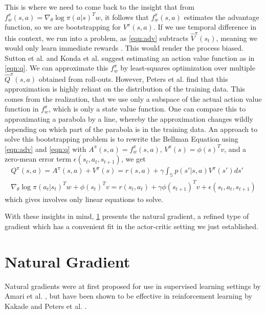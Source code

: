 This is where we need to come back to the insight that from $f_w^\pi(s,a) = {\nabla_\theta \log\pi(a|s)}^T w$, it follows that $f_w^\pi(s,a)$ estimates the advantage function, so we are bootstrapping for $V^\pi(s,a)$. 
If we use temporal difference in this context, we run into a problem, as \eqref{eqn:adv} subtracts $\hat{V}^\pi(s_t)$, meaning we would only learn immediate rewards \cite{Peters_IICHR_2003}. 
This would render the process biased. 
Sutton et al. \cite{Sutton:1999:PGM:3009657.3009806} and Konda et al. \cite{NIPS1999_1786} suggest estimating an action value function as in \eqref{eqn:q}. 
We can approximate this $f_w^\pi$ by least-squares optimization over multiple $\hat{Q}^\pi(s,a)$ obtained from roll-outs. 
However, Peters et al. \cite{4863} find that this approximation is highly reliant on the distribution of the training data. 
This comes from the realization, that we use only a subspace of the actual action value function in $f_w^\pi$, which is only a state value function. 
One can compare this to approximating a parabola by a line, whereby the approximation changes wildly depending on which part of the parabola is in the training data. 
An approach to solve this bootstrapping problem is to rewrite the Bellman Equation using \eqref{eqn:adv} and \eqref{eqn:q} with $A^\pi(s,a) = f_w^\pi(s,a)$, $V^\pi(s) = \phi(s)^T v$, and a zero-mean error term $\epsilon(s_t,a_t,s_{t+1})$, we get
\begin{align}
  Q^\pi(s,a) = A^\pi(s,a) + V^\pi(s) = r(s,a) + \gamma \int_\mathbb{S} p(s'|s,a)V^\pi(s')ds' \\
  \nabla_\theta \log \pi(a_t|s_t)^T w + \phi(s_t)^T v = r(s_t,a_t) + \gamma \phi(s_{t+1})^T v + \epsilon(s_t,a_t,s_{t+1})
\end{align}
which gives involves only linear equations to solve. \cite{4863} 

With these insights in mind, \ref{sec:natural} presents the natural gradient, a refined type of gradient which has a convenient fit in the actor-critic setting we just established.

\section{Natural Gradient}
\label{sec:natural}

Natural gradients were at first proposed for use in supervised learning settings by Amari et al. \cite{Amari:1998:NGW:287476.287477}, but have been shown to be effective in reinforcement learning by Kakade \cite{Kakade:2001} and Peters et al. \cite{4863}.


